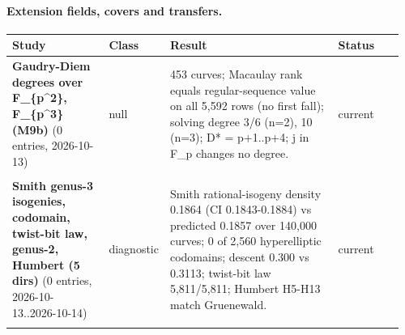\paragraph{Extension fields, covers and transfers.}
{\footnotesize\setlength{\tabcolsep}{3pt}
\begin{longtable}{@{}>{\raggedright}p{0.25\linewidth}>{\raggedright}p{0.10\linewidth}>{\raggedright}p{0.44\linewidth}>{\raggedright\arraybackslash}p{0.17\linewidth}@{}}
\toprule Study & Class & Result & Status\\ \midrule \endhead
\bottomrule \endfoot
\textbf{Gaudry-Diem degrees over F\_\allowbreak{}\{p\textasciicircum{}2\}, F\_\allowbreak{}\{p\textasciicircum{}3\} (M9b)} (0 entries, 2026-10-13) & null & 453 curves; Macaulay rank equals regular-sequence value on all 5,592 rows (no first fall); solving degree 3/\allowbreak{}6 (n=2), 10 (n=3); D* = p+1..p+4; j in F\_\allowbreak{}p changes no degree. & current\\*
\multicolumn{4}{@{}p{0.98\linewidth}@{}}{\scriptsize \hspace*{1em}Members: }\\[2pt]
\textbf{Smith genus-3 isogenies, codomain, twist-bit law, genus-2, Humbert (5 dirs)} (0 entries, 2026-10-13..2026-10-14) & diagnostic & Smith rational-isogeny density 0.1864 (CI 0.1843-0.1884) vs predicted 0.1857 over 140,000 curves; 0 of 2,560 hyperelliptic codomains; descent 0.300 vs 0.3113; twist-bit law 5,811/\allowbreak{}5,811; Humbert H5-H13 match Gruenewald. & current\\*
\multicolumn{4}{@{}p{0.98\linewidth}@{}}{\scriptsize \hspace*{1em}Members: }\\[2pt]
\end{longtable}}
